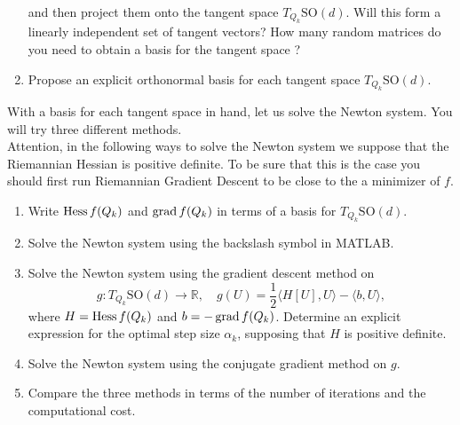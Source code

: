 \documentclass[en, oneside]{assignment}
\begin{document}
\begin{prob}
\begin{enumerate}[label=(\arabic*), resume]
        and then  project them onto the tangent space $T_{Q_k}\text{SO}(d)$.
        Will this form a linearly independent set of tangent vectors? 
        How many random matrices do you need to obtain a basis for the tangent space ?
        \item Propose an explicit orthonormal basis for each tangent space $T_{Q_k}\text{SO}(d)$.
    \end{enumerate}
    With a basis for each tangent space in hand, let us solve the Newton system. You will try three different methods.\\
    Attention, in the following ways to solve the Newton system we suppose that the Riemannian Hessian is positive definite. 
    To be sure that this is the case you should first run Riemannian Gradient Descent to be close to the a minimizer of $f$.
    \begin{enumerate}[label=(\arabic*), resume]
        \item Write $\operatorname{Hess} f(Q_k)$ and $\operatorname{grad} f(Q_k)$ in terms of a basis for $T_{Q_k}\text{SO}(d)$.
        \item Solve the Newton system using the backslash symbol in MATLAB.
        \item Solve the Newton system using the gradient descent method on 
        \begin{equation*}
            g: T_{Q_k}\text{SO}(d) \to \mathbb{R}, \quad g(U) = \frac{1}{2}\langle H[U], U \rangle - \langle b, U \rangle,
        \end{equation*}
        where $H = \operatorname{Hess} f(Q_k)$ and $b = -\operatorname{grad} f(Q_k)$. Determine an explicit expression for the optimal step size $\alpha_k$, supposing that $H$ is positive definite.
        \item Solve the Newton system using the conjugate gradient method on $g$.
        \item Compare the three methods in terms of the number of iterations and the computational cost.
    \end{enumerate}
\end{prob}
\end{document}
